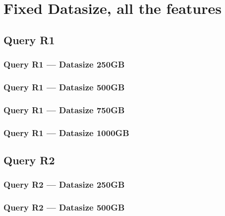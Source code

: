 \newpage
\section{Fixed Datasize, all the features}
\subsection{Query R1}
\subsubsection{Query R1 --- Datasize 250GB}



\newpage
\subsubsection{Query R1 --- Datasize 500GB}



\newpage
\subsubsection{Query R1 --- Datasize 750GB}



\newpage
\subsubsection{Query R1 --- Datasize 1000GB}



\newpage
\subsection{Query R2}
\subsubsection{Query R2 --- Datasize 250GB}



\newpage
\subsubsection{Query R2 --- Datasize 500GB}



